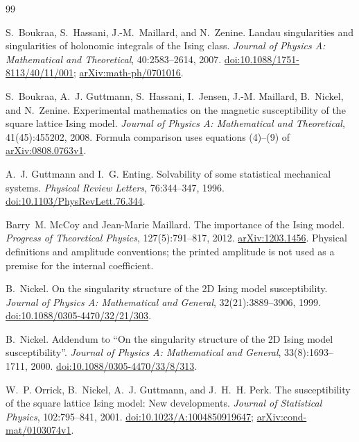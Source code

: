 \documentclass[11pt]{article}
\numberwithin{equation}{section}
\theoremstyle{definition}
\begin{document}
\begin{thebibliography}{99}

S.~Boukraa, S.~Hassani, J.-M.~Maillard, and N.~Zenine.
\newblock Landau singularities and singularities of holonomic integrals
of the Ising class.
\newblock \emph{Journal of Physics A: Mathematical and Theoretical},
40:2583--2614, 2007.
\newblock \href{https://doi.org/10.1088/1751-8113/40/11/001}{doi:10.1088/1751-8113/40/11/001};
\href{https://arxiv.org/abs/math-ph/0701016}{arXiv:math-ph/0701016}.

S.~Boukraa, A.~J. Guttmann, S.~Hassani, I.~Jensen, J.-M. Maillard,
B.~Nickel, and N.~Zenine.
\newblock Experimental mathematics on the magnetic susceptibility of the
square lattice {Ising} model.
\newblock \emph{Journal of Physics A: Mathematical and Theoretical},
41(45):455202, 2008.
\newblock Formula comparison uses equations (4)--(9) of
\href{https://arxiv.org/abs/0808.0763v1}{arXiv:0808.0763v1}.

A.~J. Guttmann and I.~G. Enting.
\newblock Solvability of some statistical mechanical systems.
\newblock \emph{Physical Review Letters}, 76:344--347, 1996.
\newblock \href{https://doi.org/10.1103/PhysRevLett.76.344}{doi:10.1103/PhysRevLett.76.344}.

Barry~M. McCoy and Jean-Marie Maillard.
\newblock The importance of the {Ising} model.
\newblock \emph{Progress of Theoretical Physics}, 127(5):791--817, 2012.
\newblock \href{https://arxiv.org/abs/1203.1456}{arXiv:1203.1456}.
Physical definitions and amplitude conventions; the printed amplitude
is not used as a premise for the internal coefficient.

B.~Nickel.
\newblock On the singularity structure of the 2D {Ising} model susceptibility.
\newblock \emph{Journal of Physics A: Mathematical and General},
32(21):3889--3906, 1999.
\newblock \href{https://doi.org/10.1088/0305-4470/32/21/303}{doi:10.1088/0305-4470/32/21/303}.

B.~Nickel.
\newblock Addendum to ``On the singularity structure of the 2D {Ising}
model susceptibility''.
\newblock \emph{Journal of Physics A: Mathematical and General},
33(8):1693--1711, 2000.
\newblock \href{https://doi.org/10.1088/0305-4470/33/8/313}{doi:10.1088/0305-4470/33/8/313}.

W.~P. Orrick, B.~Nickel, A.~J. Guttmann, and J.~H.~H. Perk.
\newblock The susceptibility of the square lattice {Ising} model:
New developments.
\newblock \emph{Journal of Statistical Physics}, 102:795--841, 2001.
\newblock \href{https://doi.org/10.1023/A:1004850919647}{doi:10.1023/A:1004850919647};
\href{https://arxiv.org/abs/cond-mat/0103074v1}{arXiv:cond-mat/0103074v1}.


\end{thebibliography}
\end{document}
